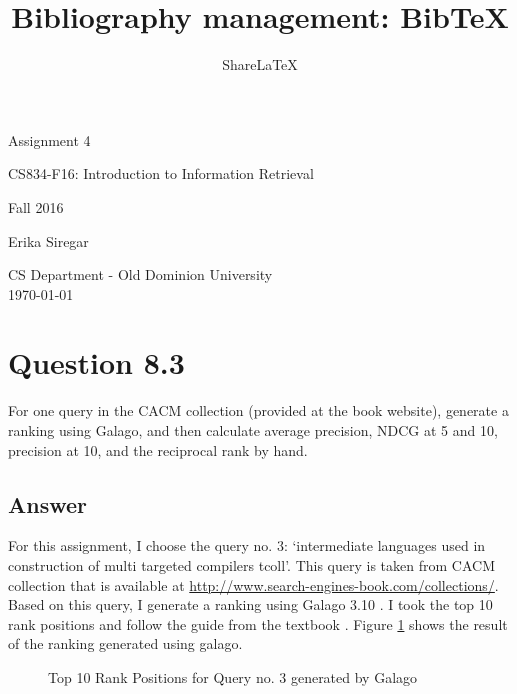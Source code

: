\documentclass[letterpaper,11pt]{article}
\title{Bibliography management: BibTeX}
\author{Share\LaTeX}
\begin{document}
\begin{titlepage}

\begin{center}

\Huge{Assignment 4}

\Large{CS834-F16:  Introduction to Information Retrieval}

\Large{Fall 2016}


\Large{Erika Siregar}

\vfill

\Large{CS Department - Old Dominion University  \\ \today}


\end{center}

\end{titlepage}


\section*{Question 8.3}
\begin{spverbatim}
For one query in the CACM collection (provided at the book website), generate a ranking using Galago, and then calculate average precision, NDCG at 5 and 10, precision at 10, and the reciprocal rank by hand.
\end{spverbatim}

\subsection*{Answer}
For this assignment, I choose the query no. 3: `intermediate languages used in construction of multi targeted compilers  tcoll'. This query is taken from CACM collection that is available at \url{http://www.search-engines-book.com/collections/}. Based on this query, I generate a ranking using Galago 3.10 \cite{galago_3.10}. I took the top 10 rank positions and follow the guide from the textbook \cite{Croft:2009:SEI:1516224}. Figure \ref{fig:query3_rank} shows the result of the ranking generated using galago. 

\begin{figure}[H]
	\centering
	\caption{Top 10 Rank Positions for Query no. 3 generated by Galago}
	\label{fig:query3_rank}
\end{figure}
\end{document}
